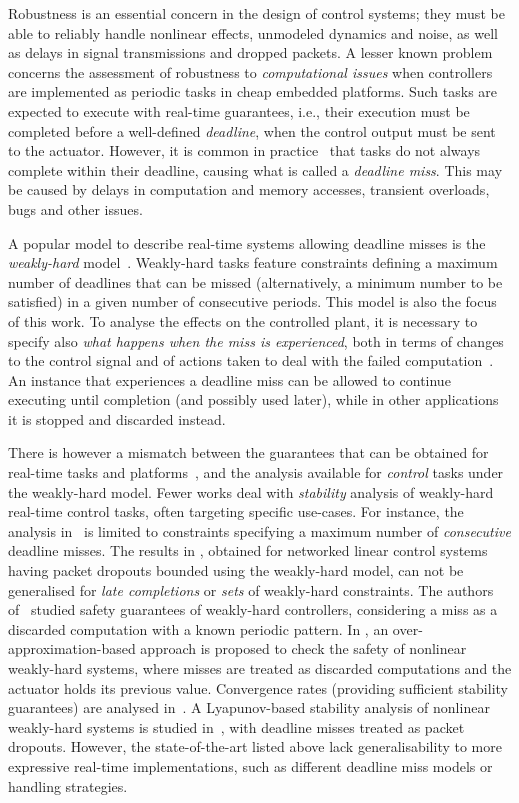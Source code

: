 Robustness is an essential concern in the design of control systems; they must be able to reliably handle nonlinear effects, unmodeled dynamics and noise, as well as delays in signal transmissions and dropped packets.
A lesser known problem concerns the assessment of robustness to \emph{computational issues} when controllers are implemented as periodic tasks in cheap embedded platforms.
Such tasks are expected to execute with real-time guarantees, i.e., their execution must be completed before a well-defined \emph{deadline}, when the control output must be sent to the actuator.
However, it is common in practice~\cite{akesson2020empirical} that tasks do not always complete within their deadline, causing what is called a \emph{deadline miss}.
This may be caused by delays in computation and memory accesses, transient overloads, bugs and other issues.

A popular model to describe real-time systems allowing deadline misses is the \emph{weakly-hard} model~\cite{Bernat:2001}. 
Weakly-hard tasks feature constraints defining a maximum number of deadlines that can be missed (alternatively, a minimum number to be satisfied) in a given number of consecutive periods.
This model is also the focus of this work.
To analyse the effects on the controlled plant, it is necessary to specify also \emph{what happens when the miss is experienced}, both in terms of changes to the control signal and of actions taken to deal with the failed computation~\cite{Pazzaglia:2019}.
An instance that experiences a deadline miss can be allowed to continue executing until completion (and possibly used later), while in other applications it is stopped and discarded instead.

There is however a mismatch between the guarantees that can be obtained for real-time tasks and platforms~\cite{Ernst:2015,choi2019job}, and the analysis available for \emph{control} tasks under the weakly-hard model.
Fewer works deal with \emph{stability} analysis of weakly-hard real-time control tasks, often targeting specific use-cases. 
For instance, the analysis in~\cite{Maggio:2020} is limited to constraints specifying a maximum number of \emph{consecutive} deadline misses.
The results in \cite{Linsenmayer:2017,linsenmayer2020linear}, obtained for networked linear control systems having packet dropouts bounded using the weakly-hard model, can not be generalised for \emph{late completions} or \emph{sets} of weakly-hard constraints.
The authors of~\cite{liang2019security,liang2020leveraging} studied safety guarantees of weakly-hard controllers, considering a miss as a discarded computation with a known periodic pattern.
%
In \cite{huang2020saw, huang2019formal}, an over-approximation-based approach is proposed to check the safety of nonlinear weakly-hard systems, where misses are treated as discarded computations and the actuator holds its previous value.
Convergence rates (providing sufficient stability guarantees) are analysed in~\cite{Gaukler:2019a}.
A Lyapunov-based stability analysis of nonlinear weakly-hard systems is studied in~\cite{hertneck2021efficient}, with deadline misses treated as packet dropouts.
However, the state-of-the-art listed above lack generalisability to more expressive real-time implementations, such as different deadline miss models or handling strategies.

